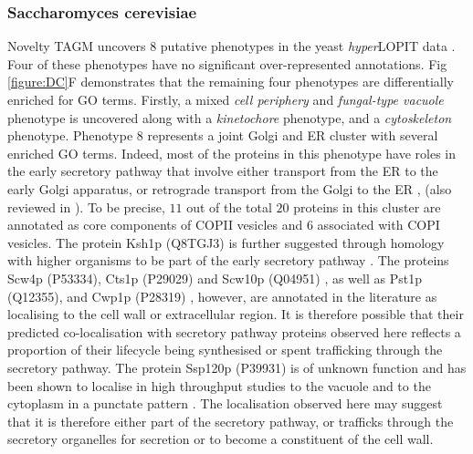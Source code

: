 \documentclass[12pt,english]{article}
\begin{document}
 \subsubsection*{Saccharomyces cerevisiae}
Novelty TAGM uncovers $8$ putative phenotypes in the yeast \textit{hyper}LOPIT data \citep{Nightingale::2019}. Four of these phenotypes have no significant over-represented annotations.
Fig \ref{figure:DC}F demonstrates that the remaining four phenotypes are differentially enriched for GO terms. Firstly, a mixed \textit{cell periphery} and \textit{fungal-type vacuole} phenotype is uncovered along with a \textit{kinetochore} phenotype, and a \textit{cytoskeleton} phenotype. Phenotype $8$ represents a joint Golgi and ER cluster with several enriched GO terms.  Indeed, most of the proteins in this phenotype have roles in the early secretory pathway that involve either transport from the ER to the early Golgi apparatus, or retrograde transport from the Golgi to the ER \citep{Bue:2006,Inadome:2005, Otte:2001, Yofe:2016}, (also reviewed in \cite{Delic:2013}).
To be precise, $11$ out of the total $20$ proteins in this cluster are annotated as core components of COPII vesicles and $6$ associated with COPI vesicles. The protein Ksh1p (Q8TGJ3) is further suggested through homology with higher organisms to be part of the early secretory pathway \citep{Wendler:2010}. The proteins Scw4p (P53334), Cts1p (P29029) and Scw10p (Q04951) \citep{Cappellaro:1998}, as well as Pst1p (Q12355)\citep{Pardo:2004}, and Cwp1p (P28319) \citep{Yin:2005}, however, are annotated in the literature as localising to the cell wall or extracellular region. It is therefore possible that their predicted co-localisation with secretory pathway proteins observed here reflects a proportion of their lifecycle being synthesised or spent trafficking through the secretory pathway. The protein Ssp120p (P39931) is of unknown function and has been shown to localise in high throughput studies to the vacuole \citep{Yofe:2016} and to the cytoplasm in a punctate pattern \citep{Huh:2003}. The localisation observed here may suggest that it is therefore either part of the secretory pathway, or trafficks through the secretory organelles for secretion or to become a constituent of the cell wall. 
\end{document}
